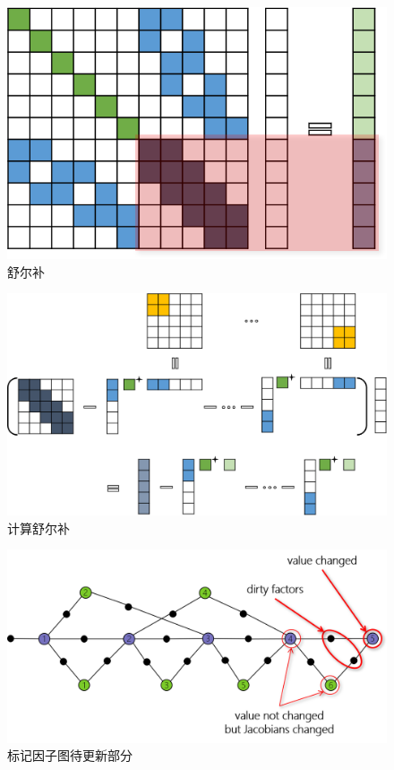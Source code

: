 \begin{figure}[htb]
    \centering
    \includegraphics{figs/reduced_sys.png}
    \caption{舒尔补}
\end{figure}

\begin{figure}[htb]
    \centering
    \includegraphics[width=\textwidth]{figs/schur_complement.png}
    \caption{计算舒尔补}
\end{figure}

\begin{figure}[htb]
    \centering
    \includegraphics[width=.8\textwidth]{figs/factor_graph_dirty.png}
    \caption{标记因子图待更新部分}
\end{figure}

